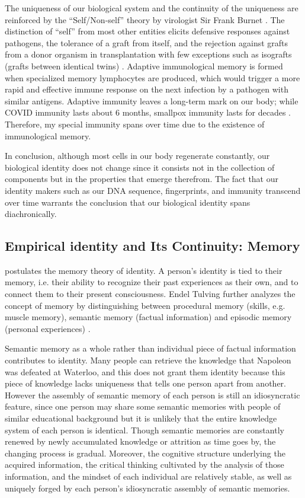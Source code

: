 \documentclass[a4paper,english,12pt]{scrartcl}
\begin{document}
The uniqueness of our biological system and the continuity of the
uniqueness are reinforced by the ``Self/Non-self'' theory by virologist
Sir Frank Burnet \parencite{BurnetFenner}. The distinction of ``self''
from most other entities elicits defensive responses against pathogens,
the tolerance of a graft from itself, and the rejection against grafts
from a donor organism in transplantation with few exceptions such
as isografts (grafts between identical twins) \parencite{pradeu2011limits}.
Adaptive immunological memory is formed when specialized memory lymphocytes
are produced, which would trigger a more rapid and effective immune
response on the next infection by a pathogen with similar antigens.
Adaptive immunity leaves a long-term mark on our body; while COVID
immunity lasts about 6 months, smallpox immunity lasts for decades
\parencite{Taub2008-ps}. Therefore, my special immunity spans over
time due to the existence of immunological memory.

In conclusion, although most cells in our body regenerate constantly,
our biological identity does not change since it consists not in the
collection of components but in the properties that emerge therefrom.
The fact that our identity makers such as our DNA sequence, fingerprints,
and immunity transcend over time warrants the conclusion that our
biological identity spans diachronically.

\subsection{Empirical identity and Its Continuity: Memory}

\textcite{LockeHumanUnderstanding} postulates the memory theory of
identity. A person's identity is tied to their memory, i.e. their
ability to recognize their past experiences as their own, and to connect
them to their present consciousness. Endel Tulving further analyzes
the concept of memory by distinguishing between procedural memory
(skills, e.g. muscle memory), semantic memory (factual information)
and episodic memory (personal experiences) \parencite{OutOfThePast}. 

Semantic memory as a whole rather than individual piece of factual
information contributes to identity. Many people can retrieve the
knowledge that Napoleon was defeated at Waterloo, and this does not
grant them identity because this piece of knowledge lacks uniqueness
that tells one person apart from another. However the assembly of
semantic memory of each person is still an idiosyncratic feature,
since one person may share some semantic memories with people of similar
educational background but it is unlikely that the entire knowledge
system of each person is identical. Though semantic memories are constantly
renewed by newly accumulated knowledge or attrition as time goes by,
the changing process is gradual. Moreover, the cognitive structure
underlying the acquired information, the critical thinking cultivated
by the analysis of those information, and the mindset of each individual
are relatively stable, as well as uniquely forged by each person's
idiosyncratic assembly of semantic memories.
\end{document}
